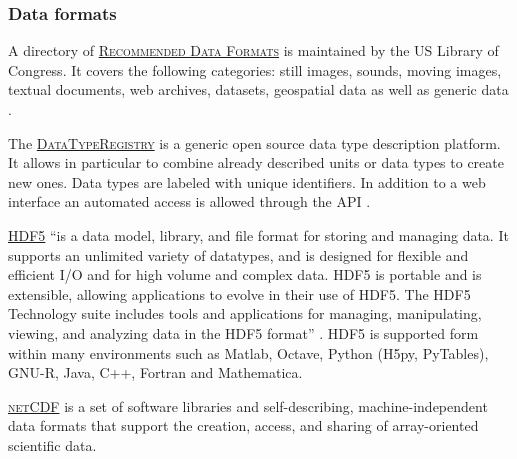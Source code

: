 \subsubsection{Data formats}

\noindent A directory of   \textsc{\href{http://www.digitalpreservation.gov/formats/}{Recommended Data Formats}} is maintained by the US Library of Congress. It covers the following categories: still images, sounds, moving images, textual documents, web archives, datasets, geospatial data as well as generic data \cite{libraryofcongress_sustainability_2015}.

\vspace{0.4cm}

\noindent The  \textsc{\href{http://www.typeregistry.org/registrar/}{DataTypeRegistry}} is a generic open source data type description platform. It allows in particular to combine already described units or data types to create new ones. Data types are labeled with unique identifiers. In addition to a web interface an automated access is allowed through the API \cite{datatyperegistry_data_2015}.

\vspace{0.4cm}

\noindent {}  \textsc{\href{https://www.hdfgroup.org/HDF5/}{HDF5}} ``is a data model, library, and file format for storing and managing data. It supports an unlimited variety of datatypes, and is designed for flexible and efficient I/O and for high volume and complex data. HDF5 is portable and is extensible, allowing applications to evolve in their use of HDF5. The HDF5 Technology suite includes tools and applications for managing, manipulating, viewing, and analyzing data in the HDF5 format'' \cite{hdf_group_hdf5_2015}. HDF5 is supported form within many environments such as Matlab, Octave, Python (H5py, PyTables), GNU-R, Java, C++, Fortran and Mathematica.

\vspace{0.4cm}

\noindent {}  \textsc{\href{http://www.unidata.ucar.edu/software/netcdf/}{netCDF}} is a set of software libraries and self-describing, machine-independent data formats that support the creation, access, and sharing of array-oriented scientific data.

\vspace{0.4cm}


